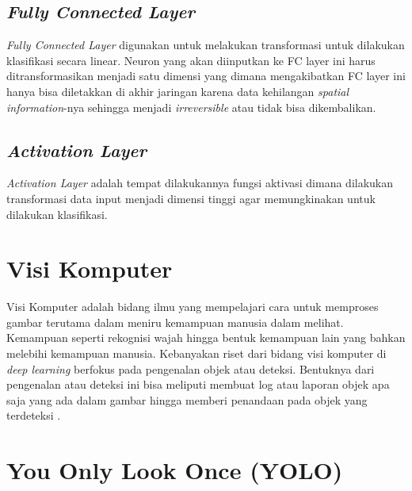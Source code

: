 \subsection{\emph{Fully Connected Layer}}
\label{subsec:fullyconnectedlayer}

\par \emph{Fully Connected Layer} digunakan untuk melakukan transformasi untuk dilakukan klasifikasi secara linear.
Neuron yang akan diinputkan ke FC layer ini harus ditransformasikan menjadi satu dimensi yang dimana
mengakibatkan FC layer ini hanya bisa diletakkan di akhir jaringan karena data kehilangan \emph{spatial information}-nya
sehingga menjadi \emph{irreversible} atau tidak bisa dikembalikan.

\subsection{\emph{Activation Layer}}
\label{subsec:activationlayer}

\par \emph{Activation Layer} adalah tempat dilakukannya fungsi aktivasi dimana dilakukan transformasi data input
menjadi dimensi tinggi agar memungkinakan untuk dilakukan klasifikasi\cite{putra2016klasifikasi}.


\section{Visi Komputer}
\label{sec:visikomputer}

Visi Komputer adalah bidang ilmu yang mempelajari cara untuk memproses gambar terutama dalam meniru
kemampuan manusia dalam melihat. Kemampuan seperti rekognisi wajah hingga bentuk kemampuan lain yang bahkan
melebihi kemampuan manusia. Kebanyakan riset dari bidang visi komputer di \emph{deep learning} berfokus pada
pengenalan objek atau deteksi. Bentuknya dari pengenalan atau deteksi ini bisa meliputi membuat log atau laporan
objek apa saja yang ada dalam gambar hingga memberi penandaan pada objek yang terdeteksi \cite{Goodfellow-et-al-2016}. 

\section{You Only Look Once (YOLO)}
\label{sec:youonlylookone}

